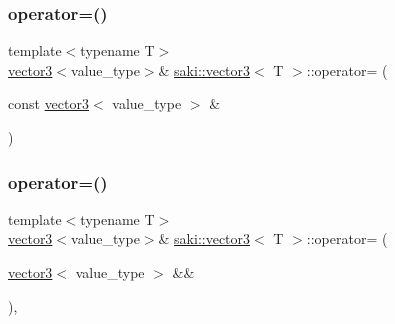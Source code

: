 \mbox{\label{classsaki_1_1vector3_a9f7a6db4eb38f4b0551c0e2250326327}} 
\subsubsection{\texorpdfstring{operator=()}{operator=()}\hspace{0.1cm}{\footnotesize\ttfamily [1/2]}}
{\footnotesize\ttfamily template$<$typename T$>$ \\
\mbox{\hyperlink{classsaki_1_1vector3}{vector3}}$<$value\+\_\+type$>$\& \mbox{\hyperlink{classsaki_1_1vector3}{saki\+::vector3}}$<$ T $>$\+::operator= (\begin{DoxyParamCaption}\item[{const \mbox{\hyperlink{classsaki_1_1vector3}{vector3}}$<$ value\+\_\+type $>$ \&}]{ }\end{DoxyParamCaption})\hspace{0.3cm}{\ttfamily [default]}}

\mbox{\label{classsaki_1_1vector3_a3040b68e9d396eac595c655a8cb00c3b}} 
\subsubsection{\texorpdfstring{operator=()}{operator=()}\hspace{0.1cm}{\footnotesize\ttfamily [2/2]}}
{\footnotesize\ttfamily template$<$typename T$>$ \\
\mbox{\hyperlink{classsaki_1_1vector3}{vector3}}$<$value\+\_\+type$>$\& \mbox{\hyperlink{classsaki_1_1vector3}{saki\+::vector3}}$<$ T $>$\+::operator= (\begin{DoxyParamCaption}\item[{\mbox{\hyperlink{classsaki_1_1vector3}{vector3}}$<$ value\+\_\+type $>$ \&\&}]{ }\end{DoxyParamCaption})\hspace{0.3cm}{\ttfamily [default]}, {\ttfamily [noexcept]}}

\mbox{\label{classsaki_1_1vector3_aa6b26c430b47bc51d614bd55ba636b7f}} 
